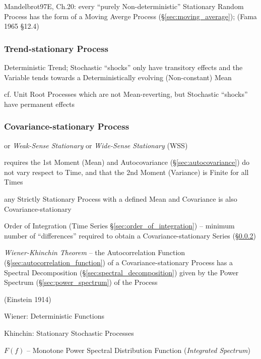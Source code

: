 Mandelbrot97E, Ch.20: every ``purely Non-deterministic'' Stationary Random
Process has the form of a Moving Averge Process (\S\ref{sec:moving_average});
(Fama 1965 \S 12.4)



\subsubsection{Trend-stationary Process}\label{sec:trend_stationary}

Deterministic Trend; Stochastic ``shocks'' only have transitory effects and the
Variable tends towards a Deterministically evolving (Non-constant) Mean

cf. Unit Root Processes which are not Mean-reverting, but Stochastic ``shocks''
have permanent effects



\subsubsection{Covariance-stationary Process}\label{sec:covariance_stationary}

or \emph{Weak-Sense Stationary} or \emph{Wide-Sense Stationary} (WSS)

requires the 1st Moment (Mean) and Autocovariance (\S\ref{sec:autocovariance})
do not vary respect to Time, and that the 2nd Moment (Variance) is Finite for
all Times

any Strictly Stationary Process with a defined Mean and Covariance is also
Covariance-stationary

\fist Order of Integration (Time Series \S\ref{sec:order_of_integration}) --
minimum number of ``differences'' required to obtain a Covariance-stationary
Series (\S\ref{sec:covariance_stationary})

\emph{Wiener-Khinchin Theorem} -- the Autocorrelation Function
(\S\ref{sec:autocorrelation_function}) of a Covariance-stationary Process has a
Spectral Decomposition (\S\ref{sec:spectral_decomposition}) given by the Power
Spectrum (\S\ref{sec:power_spectrum}) of the Process

(Einstein 1914)

Wiener: Deterministic Functions

Khinchin: Stationary Stochastic Processes

$F(f)$ -- Monotone Power Spectral Distribution Function
(\emph{Integrated Spectrum})

